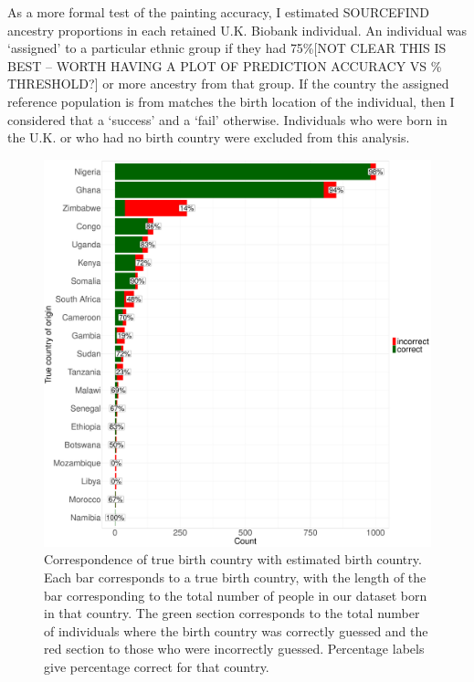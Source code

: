 {As a more formal test of the painting accuracy, I estimated SOURCEFIND ancestry proportions in each retained U.K. Biobank individual. An individual was `assigned' to a particular ethnic group if they had {\color{red}75\%[NOT CLEAR THIS IS BEST -- WORTH HAVING A PLOT OF PREDICTION ACCURACY VS \% THRESHOLD?]} or more ancestry from that group. If the country the assigned reference population is from matches the birth location of the individual, then I considered that a `success' and a `fail' otherwise. Individuals who were born in the U.K. or who had no birth country were excluded from this analysis. 

\begin{figure}[htp]
    \centering
    \includegraphics[width=1.0\textwidth]{../images/chapter3/country_of_origin_allInds.pdf}
    \caption{Correspondence of true birth country with estimated birth country. Each bar corresponds to a true birth country, with the length of the bar corresponding to the total number of people in our dataset born in that country. The green section corresponds to the total number of individuals where the birth country was correctly guessed and the red section to those who were incorrectly guessed. Percentage labels give percentage correct for that country.}
    \label{fig:country_of_origin_allInds}
\end{figure}

}
